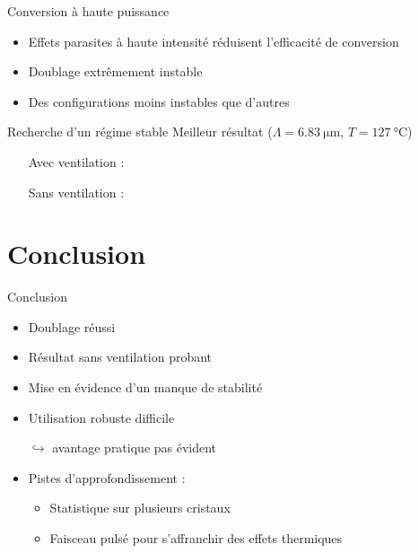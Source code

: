 \documentclass{beamer}
\begin{document}
\begin{frame}{Conversion à haute puissance}
\begin{itemize}[<+->]
\item Effets parasites à haute intensité réduisent l'efficacité de conversion
\item Doublage extrêmement instable
\item Des configurations moins instables que d'autres
\end{itemize}
\end{frame}

\begin{frame}{Recherche d'un régime stable}
Meilleur résultat ($\Lambda=\SI{6.83}{\micro\meter}$, $T = \SI{127}{\celsius}$)
\begin{itemize}
\item[ ] Avec ventilation :
\vspace*{-0.2cm} \hspace*{-0.5cm}
\begin{figure}
	\centering
	
\end{figure}
\vspace*{-1cm} \pause
\item[ ] Sans ventilation :
\vspace*{-0.2cm} \hspace*{-0.5cm}
\begin{figure}
	\centering
	
\end{figure}
\end{itemize}
\end{frame}

\section{Conclusion}

\begin{frame}{Conclusion}
\begin{itemize}%
\item Doublage réussi
\item Résultat sans ventilation probant
\item Mise en évidence d'un manque de stabilité
\item Utilisation robuste difficile
\item[$\hookrightarrow$] avantage pratique pas évident
\item Pistes d'approfondissement :
\begin{itemize}
\item Statistique sur plusieurs cristaux
\item Faisceau pulsé pour s'affranchir des effets thermiques
\end{itemize}
\end{itemize}
\end{frame}
\end{document}
